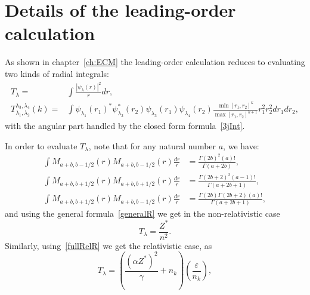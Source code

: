 \section{Details of the leading-order calculation}
\label{app:ECM}

As shown in chapter~\ref{ch:ECM} the leading-order calculation reduces to evaluating two kinds of radial integrals:
\begin{align}
    T_{\lambda} =& \int \frac{|\psi_{\lambda}(r)|^2}{r} dr,
    \\
       T^{\lambda_3,\lambda_4}_{\lambda_1,\lambda_2}(k) =& \int \psi_{\lambda_1}(r_1)^* \psi_{\lambda_2}^*(r_2) \psi_{\lambda_3}(r_1) \psi_{\lambda_4}(r_2) \frac{\min[r_1,r_2]^k}{\max[r_1,r_2]^{k+1}} r_1^2 r_2^2 dr_1 dr_2,
\end{align}
with the angular part handled by the closed form formula~\eqref{3jInt}.

In order to evaluate $T_{\lambda}$, note that for any natural number $a$, we have:
\begin{subequations}
\begin{align}
  \int M_{a+b,b-1/2}(r) M_{a+b,b-1/2}(r) \frac{dr}{r} &= \frac{\Gamma(2b)^2 (a)!}{\Gamma(a+2b)}, 
  \\
  \int M_{a+b,b+1/2}(r) M_{a+b,b+1/2}(r) \frac{dr}{r} &= \frac{\Gamma(2b+2)^2 (a-1)!}{\Gamma(a+2b+1)},
  \\
  \int M_{a+b,b+1/2}(r) M_{a+b,b-1/2}(r) \frac{dr}{r} &= \frac{\Gamma(2b)\Gamma(2b+2) (a)!}{\Gamma(a+2b+1)},
  \end{align}    
\end{subequations}
and using the general formula~\eqref{generalR} we get in the non-relativistic case
\begin{equation}
 \label{Aformula}
   T_{\lambda} = \frac{Z^*}{n^2}.
\end{equation}
Similarly, using~\eqref{fullRelR} we get the relativistic case, as
\begin{equation}%
    T_{\lambda} = \left(\frac{(\alpha Z^*)^2}{\gamma}+n_k\right)\left(\frac{\varepsilon}{n_k}\right),
\end{equation}

